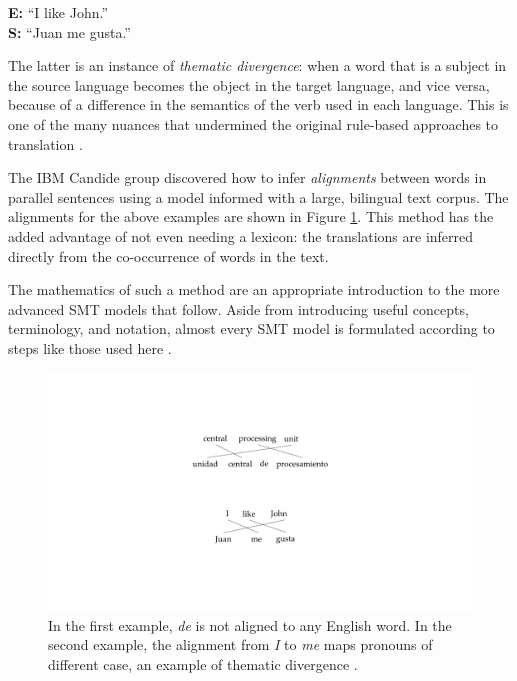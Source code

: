 \documentclass[11pt]{article}
\begin{document}
\indent\textbf{E:} ``I like John.'' \\
\indent\textbf{S:} ``Juan me gusta.''

\bigskip

The latter is an instance of \textit{thematic divergence}: when a word that is a subject in the source
language becomes the object in the target language, and vice versa, because of a difference
in the semantics of the verb used in each language. This is one of the many nuances
that undermined the original rule-based approaches to translation \cite{dorr_survey}.

The IBM Candide group discovered how to infer \textit{alignments} between
words in parallel sentences using a model informed with a large, bilingual text corpus. 
The alignments for the above examples are shown in Figure \ref{alignments}.
This method has the added advantage of not even needing a lexicon: the translations are inferred directly
from the co-occurrence of words in the text. 

The mathematics of such a method are an appropriate introduction
to the more advanced SMT models that follow.
Aside from introducing useful concepts, terminology, and notation, almost every SMT model
is formulated according to steps like those used here \cite{lopez}.

\begin{figure}
\centering
\includegraphics[trim = 300px 125px 300px 125px, scale = 0.7]{align.pdf}
\caption{In the first example, \textit{de} is not aligned to any English word. In the second example, the alignment from \textit{I} to \textit{me} maps pronouns of different case, an example of
thematic divergence \cite{dorr_survey}.}
\label{alignments}
\end{figure}
\end{document}
